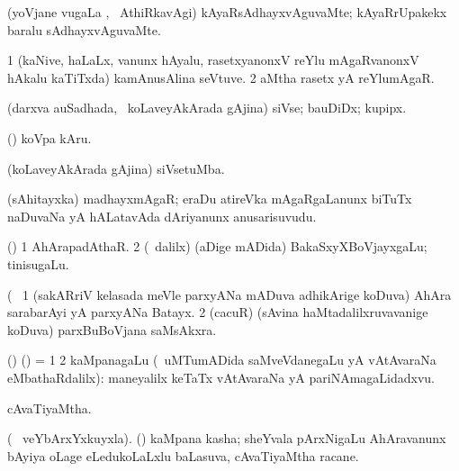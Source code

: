 \bentry
{} 
\gl{\kirxvi}
\expl{}
\bmng
 (yoVjane \mo vugaLa \vi, \kanmu\ AthiRkavAgi) kAyaRsAdhayxvAguvaMte; kAyaRrUpakekx baralu sAdhayxvAguvaMte. 
\emng
\eentry

\bentry
{} 
\gl{\nA}
\expl{}
\bmng
\bnum
\num{1} (kaNive, haLaLx, \mo vanunx hAyalu, rasetxyanonxV reYlu mAgaRvanonxV hAkalu kaTiTxda) kamAnusAlina seVtuve. 
\num{2} aMtha rasetx yA reYlumAgaR. 
\enum
\emng
\eentry

\bentry
{} 
\gl{\nA}
\expl{}
\bmng
 (darxva auSadhada, \sA\ koLaveyAkArada gAjina) siVse; bauDiDx; kupipx. 
\emng

\noindent
\gl{\pagu}
\bmng
{} (\AmA) koVpa kAru. 
\emng
\eentry

\bentry
{} 
\gl{\nA}
\bmng
 (koLaveyAkArada gAjina) siVsetuMba. 
\emng
\eentry

\bentry 
{} 
\gl{\nA}
\expl{\Latin}
\bmng
 (sAhitayxka) madhayxmAgaR; eraDu atireVka mAgaRgaLanunx biTuTx naDuvaNa yA hALatavAda dAriyanunx anusarisuvudu. 
\emng
\eentry

\bentry
{} 
\gl{\nA}
\expl{}
\bmng
 (\aupa) 
\bnum
\num{1} AhArapadAthaR. 
\num{2} (\sA\ \bava dalilx) (aDige mADida) BakaSxyXBoVjayxgaLu; tinisugaLu. 
\enum
\emng
\eentry

\bentry
{} 
\gl{\nA}(\bava\ 
\bmng
\bnum
\num{1} (sakARriV kelasada meVle parxyANa mADuva adhikArige koDuva) AhAra sarabarAyi yA parxyANa Batayx. 
\num{2} (cacuR) (sAvina haMtadalilxruvavanige koDuva) parxBuBoVjana saMsAkxra. 
\enum
\emng
\eentry

\bentry
{} 
\gl{\nA}
\expl{}
\bmng
(\bava) (\AmA) = 
\bnum
\num{1}  
\num{2} kaMpanagaLu (\kanmu\ uMTumADida saMveVdanegaLu yA vAtAvaraNa eMbathaRdalilx):  maneyalilx keTaTx vAtAvaraNa yA pariNAmagaLidadxvu. 
\enum
\emng
\eentry

\bentry
{} 
\gl{\gu}
\expl{}
\bmng
 cAvaTiyaMtha. 
\emng
\eentry

\bentry
{} 
\gl{\nA}(\bava\ 
\expl{\ucAcx}
veYbArxYxkuyxla).\bmng
 (\pArxvi) kaMpana kasha; sheYvala pArxNigaLu AhAravanunx bAyiya oLage eLedukoLaLxlu baLasuva, cAvaTiyaMtha racane.  
\emng
\eentry

